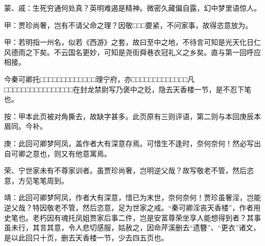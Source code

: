 
\begin{parag}
    \begin{note}蒙、戚：生死穷通何处真？英明难遏是精神。微密久藏偏自露，幻中梦里语惊人。\end{note}
\end{parag}


\begin{parag}
    \begin{note}甲：贾珍尚奢，岂有不请父命之理？因敬□□□要紧，不问家事，故得恣意放为。\end{note}
\end{parag}


\begin{parag}
    \begin{note}
        甲：若明指一州名，似若《西游》之套，故曰至中之地，不待言可知是光天化日仁风德雨之下矣。不云国名更妙，可知是尧街舜巷衣冠礼义之乡矣。直与第一回呼应相接。
    \end{note}
\end{parag}


\begin{parag}
    \begin{note}
        今秦可卿托□□□□□□□□□□□□□理宁府，亦□□□□□□□□□□□□□凡□□□□□□□□□□□□□□□□在封龙禁尉写乃褒中之贬，隐去天香楼一节，是不忍下笔也。
    \end{note}
    \begin{subnote}按：甲本此页被对角撕去，故缺字甚多。此页原有三则评语，第二则与本回庚辰本眉同。今补。\end{subnote}
\end{parag}


\begin{parag}
    \begin{note}
        庚：此回可卿梦阿凤，盖作者大有深意存焉。可惜生不逢时，奈何奈何！然必写出自可卿之意也，则又有他意寓焉。
    \end{note}
\end{parag}


\begin{parag}
    \begin{note}
        荣、宁世家未有不尊家训者。虽贾珍尚奢，岂明逆父哉？故写敬老不管，然后恣意，方见笔笔周到。
    \end{note}
\end{parag}


\begin{parag}
    \begin{note}靖：此回可卿梦阿凤，作者大有深意，惜已为末世，奈何奈何！贾珍虽奢淫，岂能逆父哉？特因敬老不管，然后恣意，足为世家之戒。“秦可卿淫丧天香楼”，作者用史笔也。老朽因有魂托凤姐贾家后事二件，岂是安富尊荣坐享人能想得到者？其事虽未行，其言其意，令人悲切感服，姑赦之，因命芹溪删去“遗簪”、“更衣”诸文，是以此回只十页，删去天香楼一节，少去四五页也。\end{note}
\end{parag}


